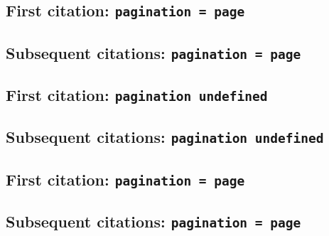 \documentclass[a4paper]{article}
\begin{document}
\cite{olson:2003}

\cite[577]{olson:2003}

\cite[note]{olson:2003}

\subsection{First citation: \texttt{pagination = page}}

\cite{olson:2003:a}

\citereset
\cite[577]{olson:2003:a}

\citereset
\cite[note]{olson:2003:a}

\subsection{Subsequent citations: \texttt{pagination = page}}

\cite{olson:2003:a}

\cite[577]{olson:2003:a}

\cite[note]{olson:2003:a}

\subsection{First citation: \texttt{pagination undefined}}

\cite{stendahl:1962}

\citereset
\cite[577]{stendahl:1962}

\citereset
\cite[note]{stendahl:1962}

\subsection{Subsequent citations: \texttt{pagination undefined}}

\cite{stendahl:1962}

\cite[577]{stendahl:1962}

\cite[note]{stendahl:1962}

\subsection{First citation: \texttt{pagination = page}}

\cite{stendahl:1962:a}

\citereset
\cite[577]{stendahl:1962:a}

\citereset
\cite[note]{stendahl:1962:a}

\subsection{Subsequent citations: \texttt{pagination = page}}
\end{document}
